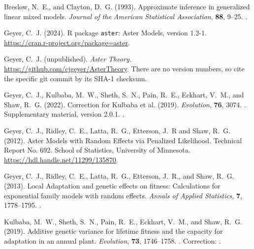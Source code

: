 \documentclass[11pt]{article}
\begin{document}
\begin{thebibliography}{}

Breslow, N.~E., and Clayton, D.~G. (1993).
\newblock Approximate inference in generalized linear mixed models.
\newblock \emph{Journal of the American Statistical Association},
    \textbf{88}, 9--25.
\newblock {}.

Geyer, C.~J. (2024).
\newblock R package \texttt{aster}: Aster Models, version 1.2-1.
\newblock \url{https://cran.r-project.org/package=aster}.

Geyer, C.~J. (unpublished).
\newblock \emph{Aster Theory}.
\newblock \url{https://github.com/cjgeyer/AsterTheory}.
\newblock There are no version numbers, so cite the specific git
    commit by its SHA-1 checksum.

Geyer, C.~J., Kulbaba, M.~W., Sheth, S.~N., Pain, R.~E., Eckhart, V.~M.,
    and Shaw, R.~G. (2022).
\newblock Correction for Kulbaba et al. (2019).
\newblock \emph{Evolution}, \textbf{76}, 3074.
\newblock {}.
\newblock Supplementary material, version 2.0.1.
\newblock {}.

Geyer, C.~J., Ridley, C.~E., Latta, R.~G., Etterson, J.~R and Shaw, R.~G.
    (2012).
\newblock Aster Models with Random Effects via Penalized Likelihood.
\newblock Technical Report No. 692.  School of Statistics,
    University of Minnesota.
\newblock \url{https://hdl.handle.net/11299/135870}.

Geyer, C.~J., Ridley, C.~E., Latta, R.~G., Etterson, J.~R., and Shaw, R.~G.
    (2013).
\newblock Local Adaptation and genetic effects on fitness: Calculations for
    exponential family models with random effects.
\newblock \emph{Annals of Applied Statistics}, \textbf{7}, 1778--1795.
\newblock {}.

Kulbaba, M.~W., Sheth, S.~N., Pain, R.~E., Eckhart, V.~M., and
    Shaw, R.~G. (2019).
\newblock Additive genetic variance for lifetime fitness and the capacity
    for adaptation in an annual plant.
\newblock \emph{Evolution}, \textbf{73}, 1746--1758.
\newblock {}.
\newblock Correction: \citet{zenodo}.


\end{thebibliography}
\end{document}
